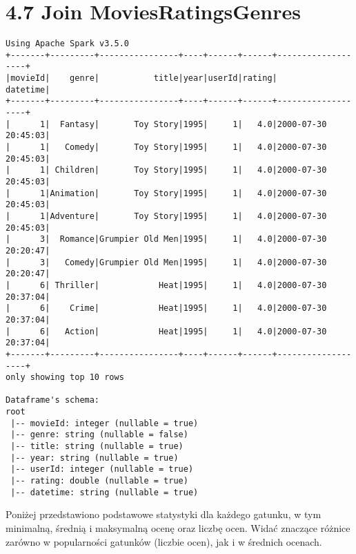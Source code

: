 \documentclass{article}
\begin{document}
\section{4.7 Join MoviesRatingsGenres}
\begin{verbatim}
Using Apache Spark v3.5.0
+-------+---------+----------------+----+------+------+-------------------+
|movieId|    genre|           title|year|userId|rating|           datetime|
+-------+---------+----------------+----+------+------+-------------------+
|      1|  Fantasy|       Toy Story|1995|     1|   4.0|2000-07-30 20:45:03|
|      1|   Comedy|       Toy Story|1995|     1|   4.0|2000-07-30 20:45:03|
|      1| Children|       Toy Story|1995|     1|   4.0|2000-07-30 20:45:03|
|      1|Animation|       Toy Story|1995|     1|   4.0|2000-07-30 20:45:03|
|      1|Adventure|       Toy Story|1995|     1|   4.0|2000-07-30 20:45:03|
|      3|  Romance|Grumpier Old Men|1995|     1|   4.0|2000-07-30 20:20:47|
|      3|   Comedy|Grumpier Old Men|1995|     1|   4.0|2000-07-30 20:20:47|
|      6| Thriller|            Heat|1995|     1|   4.0|2000-07-30 20:37:04|
|      6|    Crime|            Heat|1995|     1|   4.0|2000-07-30 20:37:04|
|      6|   Action|            Heat|1995|     1|   4.0|2000-07-30 20:37:04|
+-------+---------+----------------+----+------+------+-------------------+
only showing top 10 rows

Dataframe's schema:
root
 |-- movieId: integer (nullable = true)
 |-- genre: string (nullable = false)
 |-- title: string (nullable = true)
 |-- year: string (nullable = true)
 |-- userId: integer (nullable = true)
 |-- rating: double (nullable = true)
 |-- datetime: string (nullable = true)
\end{verbatim}

Poniżej przedstawiono podstawowe statystyki dla każdego gatunku, w tym minimalną, średnią i maksymalną ocenę oraz liczbę ocen.
Widać znaczące różnice zarówno w popularności gatunków (liczbie ocen), jak i w średnich ocenach.
\end{document}
